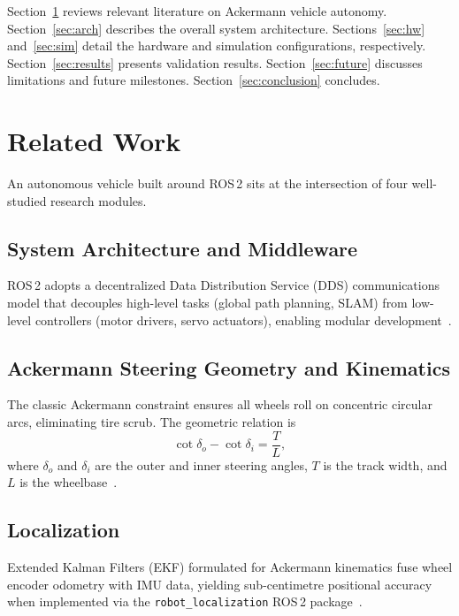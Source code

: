 \documentclass[conference]{IEEEtran}
\begin{document}
Section~\ref{sec:related} reviews relevant literature on Ackermann vehicle autonomy.
Section~\ref{sec:arch} describes the overall system architecture.
Sections~\ref{sec:hw} and~\ref{sec:sim} detail the hardware and simulation
configurations, respectively.
Section~\ref{sec:results} presents validation results.
Section~\ref{sec:future} discusses limitations and future milestones.
Section~\ref{sec:conclusion} concludes.

\section{Related Work}
\label{sec:related}

An autonomous vehicle built around ROS\,2 sits at the intersection of four
well-studied research modules.

\subsection{System Architecture and Middleware}
ROS\,2 adopts a decentralized Data Distribution Service (DDS) communications
model that decouples high-level tasks (global path planning, SLAM) from
low-level controllers (motor drivers, servo actuators), enabling modular
development~\cite{Alkhareif2021}.

\subsection{Ackermann Steering Geometry and Kinematics}
The classic Ackermann constraint ensures all wheels roll on concentric circular
arcs, eliminating tire scrub. The geometric relation is
\begin{equation}
  \cot\delta_{o} - \cot\delta_{i} = \frac{T}{L},
  \label{eq:ackermann}
\end{equation}
where $\delta_{o}$ and $\delta_{i}$ are the outer and inner steering angles,
$T$ is the track width, and $L$ is the wheelbase~\cite{Chen2023}.

\subsection{Localization}
Extended Kalman Filters (EKF) formulated for Ackermann kinematics fuse wheel
encoder odometry with IMU data, yielding sub-centimetre positional accuracy when
implemented via the \texttt{robot\_localization} ROS\,2 package~\cite{Promkaew2024,Georgiev2025}.
\end{document}
